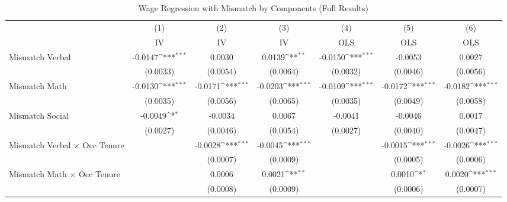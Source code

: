 {
\def\sym#1{\ifmmode^{#1}\else\(^{#1}\)\fi}
\begin{longtable}{l*{6}{c}}
\caption{Wage Regression with Mismatch by Components (Full Results)}\\
\hline  \endfirsthead\hline  \endhead\hline  \endfoot\endlastfoot
                    &\multicolumn{1}{c}{(1)}&\multicolumn{1}{c}{(2)}&\multicolumn{1}{c}{(3)}&\multicolumn{1}{c}{(4)}&\multicolumn{1}{c}{(5)}&\multicolumn{1}{c}{(6)}\\
                    &\multicolumn{1}{c}{IV}&\multicolumn{1}{c}{IV}&\multicolumn{1}{c}{IV}&\multicolumn{1}{c}{OLS}&\multicolumn{1}{c}{OLS}&\multicolumn{1}{c}{OLS}\\
\hline  
Mismatch Verbal     &     -0.0147\sym{***}&      0.0030         &      0.0139\sym{**} &     -0.0150\sym{***}&     -0.0053         &      0.0027         \\
                    &    (0.0033)         &    (0.0054)         &    (0.0064)         &    (0.0032)         &    (0.0046)         &    (0.0056)         \\
Mismatch Math       &     -0.0130\sym{***}&     -0.0171\sym{***}&     -0.0203\sym{***}&     -0.0109\sym{***}&     -0.0172\sym{***}&     -0.0182\sym{***}\\
                    &    (0.0035)         &    (0.0056)         &    (0.0065)         &    (0.0035)         &    (0.0049)         &    (0.0058)         \\
Mismatch Social     &     -0.0049\sym{*}  &     -0.0034         &      0.0067         &     -0.0041         &     -0.0046         &      0.0017         \\
                    &    (0.0027)         &    (0.0046)         &    (0.0054)         &    (0.0027)         &    (0.0040)         &    (0.0047)         \\
Mismatch Verbal $\times$ Occ Tenure&                     &     -0.0028\sym{***}&     -0.0045\sym{***}&                     &     -0.0015\sym{***}&     -0.0026\sym{***}\\
                    &                     &    (0.0007)         &    (0.0009)         &                     &    (0.0005)         &    (0.0006)         \\
Mismatch Math $\times$ Occ Tenure&                     &      0.0006         &      0.0021\sym{**} &                     &      0.0010\sym{*}  &      0.0020\sym{***}\\
                    &                     &    (0.0008)         &    (0.0009)         &                     &    (0.0006)         &    (0.0007)         \\

\end{longtable}}
